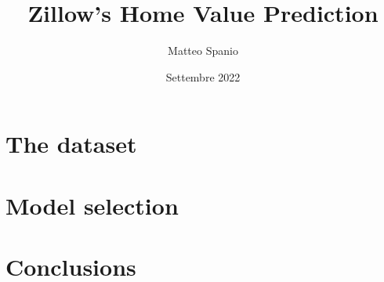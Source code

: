 \documentclass[12pt, twoside]{article}
\title{Zillow’s Home Value Prediction}
\author{Matteo Spanio}
\date{Settembre 2022}
\begin{document}
  

  \onehalfspacing

  \section{The dataset}
     
  

  \section{Model selection}

  

  \section{Conclusions}\label{conclusions}
    
  
\end{document}
